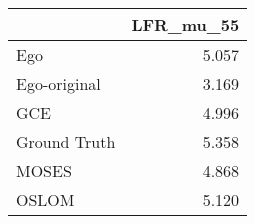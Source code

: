 \begin{tabular}{lr}
\toprule
{} & LFR_mu_55 \\
\midrule
Ego          &     5.057 \\
Ego-original &     3.169 \\
GCE          &     4.996 \\
Ground Truth &     5.358 \\
MOSES        &     4.868 \\
OSLOM        &     5.120 \\
\bottomrule
\end{tabular}
